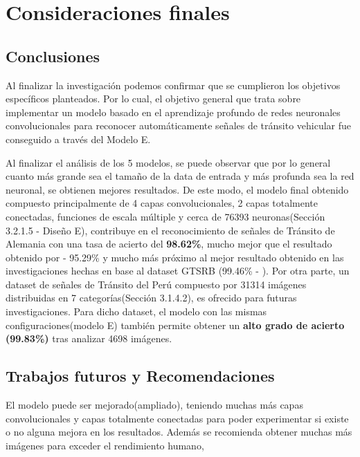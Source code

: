 \chapter{Consideraciones finales}
\setcounter{page}{138}
\renewcommand{\baselinestretch}{2} %
\textheight 21cm

\section{Conclusiones}

	Al finalizar la investigación podemos confirmar que se cumplieron los objetivos específicos planteados. Por lo cual, el objetivo general que trata sobre implementar un modelo basado en el aprendizaje profundo de redes neuronales convolucionales para reconocer automáticamente señales de tránsito vehicular fue conseguido a través del Modelo E.

	\vskip 0.2cm
	Al finalizar el análisis de los 5 modelos, se puede observar que por lo general cuanto más grande sea el tamaño de la data de entrada y más profunda sea la red neuronal, se obtienen mejores resultados. De este modo, el modelo final obtenido compuesto principalmente de 4 capas convolucionales, 2 capas totalmente conectadas, funciones de escala múltiple y cerca de 76393 neuronas(Sección 3.2.1.5 - Diseño E), contribuye en el reconocimiento de señales de Tránsito de Alemania con una tasa de acierto del {\bf 98.62\%}, mucho mejor que el resultado obtenido por \citep{Ayuque2016} - 95.29\% y mucho más próximo al mejor resultado obtenido en las investigaciones hechas en base al dataset GTSRB (99.46\% - \citep{Ciresan}).
	\vskip 0.2cm
	Por otra parte, un dataset de señales de Tránsito del Perú compuesto por 31314 imágenes distribuidas en 7 categorías(Sección 3.1.4.2), es ofrecido para futuras investigaciones. Para dicho dataset, el modelo con las mismas configuraciones(modelo E) también permite obtener un {\bf alto grado de acierto (99.83\%)} tras analizar 4698 imágenes. 
	 


\section{Trabajos futuros y Recomendaciones}


	El modelo puede ser mejorado(ampliado), teniendo muchas más capas convolucionales y capas totalmente conectadas para poder experimentar si existe o no alguna mejora en los resultados. Además se recomienda obtener muchas más imágenes para exceder el rendimiento humano, \citep{Goodfellow-et-al-2016}

